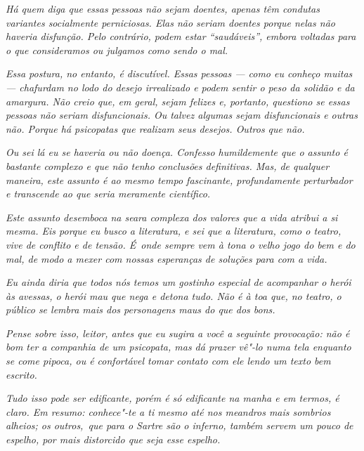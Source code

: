 \emph{Há quem diga que essas pessoas não sejam doentes, apenas têm
condutas variantes socialmente perniciosas. Elas não seriam doentes
porque nelas não haveria disfunção. Pelo contrário, podem estar
``saudáveis'', embora voltadas para o que consideramos ou julgamos como
sendo o mal.}

\emph{Essa postura, no entanto, é discutível. Essas pessoas --- como eu
conheço muitas --- chafurdam no lodo do desejo irrealizado e podem
sentir o peso da solidão e da amargura. Não creio que, em geral, sejam
felizes e, portanto, questiono se essas pessoas não seriam
disfuncionais. Ou talvez algumas sejam disfuncionais e outras não.
Porque há psicopatas que realizam seus desejos. Outros que não.}

\emph{Ou sei lá eu se haveria ou não doença. Confesso humildemente que o
assunto é bastante complexo e que não tenho conclusões definitivas. Mas,
de qualquer maneira, este assunto é ao mesmo tempo fascinante,
profundamente perturbador e transcende ao que seria meramente
científico.}

\emph{Este assunto desemboca na seara complexa dos valores que a vida
atribui a si mesma. Eis porque eu busco a literatura, e sei que a
literatura, como o teatro, vive de conflito e de tensão. É~onde sempre
vem à tona o velho jogo do bem e do mal, de modo a mexer com nossas
esperanças de soluções para com a vida.}

\emph{Eu ainda diria que todos nós temos um gostinho especial de
acompanhar o herói às avessas, o herói mau que nega e detona tudo. Não é
à toa que, no teatro, o público se lembra mais dos personagens maus do
que dos bons.}

\emph{Pense sobre isso, leitor, antes que eu sugira a você a seguinte
provocação: não é bom ter a companhia de um psicopata, mas dá prazer
vê"-lo numa tela enquanto se come pipoca, ou é confortável tomar contato
com ele lendo um texto bem escrito.}

\emph{Tudo isso pode ser edificante, porém é só edificante na manha e em
termos, é claro. Em resumo: conhece"-te a ti mesmo até nos meandros mais
sombrios alheios; os outros,~que para o Sartre são o inferno, também
servem um pouco de espelho, por mais distorcido que seja esse espelho.~}
\endgroup